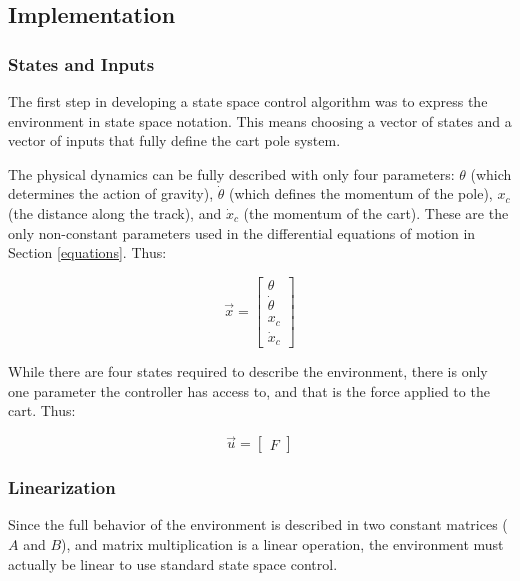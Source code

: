 \documentclass[11pt]{article}
\begin{document}
\subsection{Implementation}

\subsubsection{States and Inputs}

The first step in developing a state space control algorithm was to express the environment in state space notation. This means choosing a vector of states and a vector of inputs that fully define the cart pole system.

The physical dynamics can be fully described with only four parameters: $\theta$ (which determines the action of gravity), $\dot \theta$ (which defines the momentum of the pole), $x _c$ (the distance along the track), and $\dot x _c$ (the momentum of the cart). These are the only non-constant parameters used in the differential equations of motion in Section \ref{equations}. Thus:

\begin{equation}
    \displaystyle \vec{x} = \begin{bmatrix}
        \theta \\
        \dot \theta \\
        x _c \\
        \dot x _c
    \end{bmatrix}
\end{equation}

While there are four states required to describe the environment, there is only one parameter the controller has access to, and that is the force applied to the cart. Thus:

\begin{equation}
    \vec{u} = \begin{bmatrix}
        \displaystyle F
    \end{bmatrix}
\end{equation}

\subsubsection{Linearization}

Since the full behavior of the environment is described in two constant matrices ($A$ and $B$), and matrix multiplication is a linear operation, the environment must actually be linear to use standard state space control.
\end{document}

